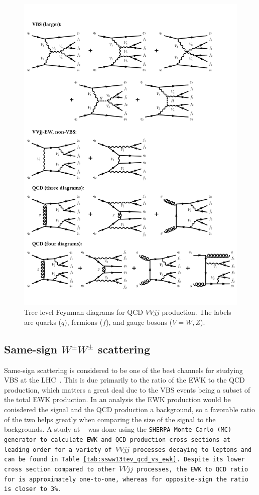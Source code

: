 \begin{figure}[htbp]
  \centering
    \includegraphics[width=\textwidth]{figs/ssww_13tev/diagrams/VbsQCD}
  \caption{Tree-level Feynman diagrams for QCD $VVjj$ production.  The labels are quarks ($q$), fermions ($f$), and gauge bosons ($V = W,Z$).}
  \label{fig:ssww13tev_diagrams_qcd}
\end{figure}

\subsection{Same-sign $W^{\pm}W^{\pm}$ scattering}\label{ssww13tev:ssww_topology}
Same-sign \ssww scattering is considered to be one of the best channels for studying VBS at the LHC~\cite{2015.higgs-constraints-from-vbs}.
This is due primarily to the ratio of the EWK to the QCD production, which matters a great deal due to the VBS events being a subset of the total EWK production.
In an analysis the EWK production would be conisdered the signal and the QCD production a background, so a favorable ratio of the two helps greatly when comparing the size of the signal to the backgrounds.
A study at ~\cite{2013.ssww-8tev-atlas-support} was done using the \tt{SHERPA} Monte Carlo (MC) generator to calculate EWK and QCD production cross sections at leading order for a variety of $VVjj$ processes decaying to leptons and can be found in Table~\ref{tab:ssww13tev_qcd_vs_ewk}.
Despite its lower cross section compared to other $VVjj$ processes, the EWK to QCD ratio for \ssww is approximately one-to-one, whereas for opposite-sign \oswwjj the ratio is closer to 3\%.

